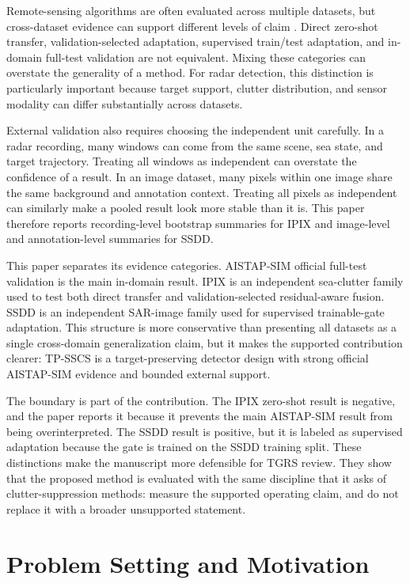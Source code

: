 \documentclass[journal]{IEEEtran}
\begin{document}
Remote-sensing algorithms are often evaluated across multiple datasets, but cross-dataset evidence can support different levels of claim \cite{tuia2016domain}. Direct zero-shot transfer, validation-selected adaptation, supervised train/test adaptation, and in-domain full-test validation are not equivalent. Mixing these categories can overstate the generality of a method. For radar detection, this distinction is particularly important because target support, clutter distribution, and sensor modality can differ substantially across datasets.

External validation also requires choosing the independent unit carefully. In a radar recording, many windows can come from the same scene, sea state, and target trajectory. Treating all windows as independent can overstate the confidence of a result. In an image dataset, many pixels within one image share the same background and annotation context. Treating all pixels as independent can similarly make a pooled result look more stable than it is. This paper therefore reports recording-level bootstrap summaries for IPIX and image-level and annotation-level summaries for SSDD.

This paper separates its evidence categories. AISTAP-SIM official full-test validation is the main in-domain result. IPIX is an independent sea-clutter family used to test both direct transfer and validation-selected residual-aware fusion. SSDD is an independent SAR-image family used for supervised trainable-gate adaptation. This structure is more conservative than presenting all datasets as a single cross-domain generalization claim, but it makes the supported contribution clearer: TP-SSCS is a target-preserving detector design with strong official AISTAP-SIM evidence and bounded external support.

The boundary is part of the contribution. The IPIX zero-shot result is negative, and the paper reports it because it prevents the main AISTAP-SIM result from being overinterpreted. The SSDD result is positive, but it is labeled as supervised adaptation because the gate is trained on the SSDD training split. These distinctions make the manuscript more defensible for TGRS review. They show that the proposed method is evaluated with the same discipline that it asks of clutter-suppression methods: measure the supported operating claim, and do not replace it with a broader unsupported statement.

\section{Problem Setting and Motivation}
\end{document}
